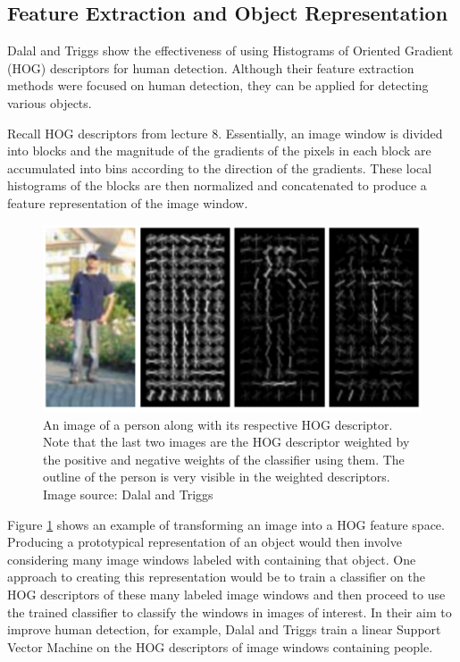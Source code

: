 \documentclass{article}
\begin{document}
\subsection{Feature Extraction and Object Representation}
Dalal and Triggs \cite{hog_human_detection} show the effectiveness of using Histograms of Oriented Gradient (HOG) descriptors for human detection. Although their feature extraction methods were focused on human detection, they can be applied for detecting various objects. 

Recall HOG descriptors from lecture 8. Essentially, an image window is divided into blocks and the magnitude of the gradients of the pixels in each block are accumulated into bins according to the direction of the gradients. These local histograms of the blocks are then normalized and concatenated to produce a feature representation of the image window.

\begin{figure}[H]
	\includegraphics[width=\linewidth, scale=0.3]{person_template.png}
	\caption{An image of a person along with its respective HOG descriptor. Note that the last two images are the HOG descriptor weighted by the positive and negative weights of the classifier using them. The outline of the person is very visible in the weighted descriptors. Image source: Dalal and Triggs \cite{hog_human_detection}}
    \label{fig:hog_descriptor}
\end{figure}

Figure \ref{fig:hog_descriptor} shows an example of transforming an image into a HOG feature space. Producing a prototypical representation of an object would then involve considering many image windows labeled with containing that object. One approach to creating this representation would be to train a classifier on the HOG descriptors of these many labeled image windows and then proceed to use the trained classifier to classify the windows in images of interest. In their aim to improve human detection, for example, Dalal and Triggs \cite{hog_human_detection} train a linear Support Vector Machine on the HOG descriptors of image windows containing people.
\end{document}
